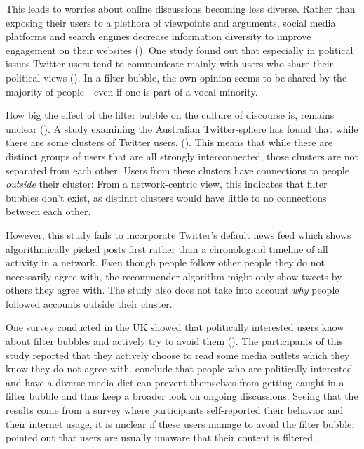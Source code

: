 This leads to worries about online discussions becoming less diverse. Rather than exposing their users to a plethora of viewpoints and arguments, social media platforms and search engines decrease information diversity to improve engagement on their websites (\cite{bozdagBreakingFilterBubble2015}). One study found out that especially in political issues Twitter users tend to communicate mainly with users who share their political views (\cite{barberaTweetingLeftRight2015}). In a filter bubble, the own opinion seems to be shared by the majority of people---even if one is part of a vocal minority.

How big the effect of the filter bubble on the culture of discourse is, remains unclear (\cite{brunsEchoChamberWhat2017}). A study examining the Australian Twitter-sphere has found that while there are some clusters of Twitter users,  (\cite[9]{brunsEchoChamberWhat2017}). This means that while there are distinct groups of users that are all strongly interconnected, those clusters are not separated from each other. Users from these clusters have connections to people \emph{outside} their cluster: From a network-centric view, this indicates that filter bubbles don't exist, as distinct clusters would have little to no connections between each other.

However, this study fails to incorporate Twitter's default news feed which shows algorithmically picked posts first rather than a chronological timeline of all activity in a network. Even though people follow other people they do not necessarily agree with, the recommender algorithm might only show tweets by others they agree with. The study also does not take into account \emph{why} people followed accounts outside their cluster. 

One survey conducted in the UK showed that politically interested users know about filter bubbles and actively try to avoid them (\cite{duboisEchoChamberOverstated2018}). The participants of this study reported that they actively choose to read some media outlets which they know they do not agree with. \citeauthor{duboisEchoChamberOverstated2018} conclude that people who are politically interested and have a diverse media diet can prevent themselves from getting caught in a filter bubble and thus keep a broader look on ongoing discussions. Seeing that the results come from a survey where participants self-reported their behavior and their internet usage, it is unclear if these users manage to avoid the filter bubble: \citeauthor{bozdagBreakingFilterBubble2015} pointed out that users are usually unaware that their content is filtered. 

